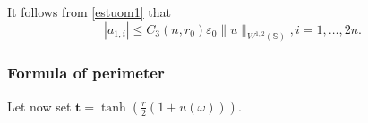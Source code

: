 \documentclass[11pt]{amsart}
\numberwithin{equation}{section}
\begin{document}


It follows from \eqref{estuom1} that
\begin{equation}\label{estuom}\left|a_{1,i}\right|\le C_3(n,r_0)\varepsilon_0\|u\|_{W^{1,2}(\mathbb{S})}, i=1,\dots, 2n.\end{equation}

\subsubsection{Formula of perimeter} Let now set  $\mathbf{t}=\tanh(\frac{r}{2}(1+u(\omega)))$.
\end{document}
